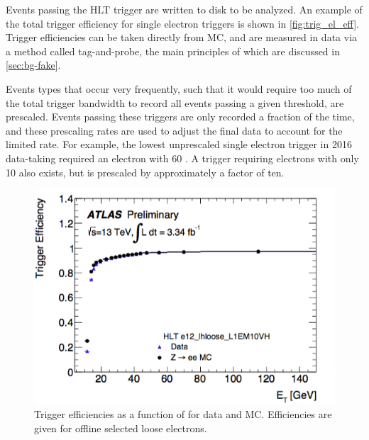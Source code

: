Events passing the \ac{HLT} trigger are written to disk to be analyzed. An example of the total trigger efficiency for single electron triggers is shown in \autoref{fig:trig_el_eff}. Trigger efficiencies can be taken directly from \ac{MC}, and are measured in data via a method called tag-and-probe, the main principles of which are discussed in \autoref{sec:bg-fake}.


Events types that occur very frequently, such that it would require too much of the total trigger bandwidth to record all events passing a given threshold, are prescaled. Events passing these triggers are only recorded a fraction of the time, and these prescaling rates are used to adjust the final data to account for the limited rate. For example, the lowest unprescaled single electron trigger in 2016 data-taking required an electron with 60 \gev \pt. A trigger requiring electrons with only 10 \gev \pt also exists, but is prescaled by approximately a factor of ten. 

\begin{centering}
\begin{figure}[!hbt]
\myfloatalign
\includegraphics[width=.90\linewidth]{figures/atlas/el_trig_eff.png}
\caption{Trigger efficiencies as a function of \et for data and \ac{MC}. Efficiencies are given for offline selected loose electrons.}
\label{fig:trig_el_eff}
\end{figure}
\end{centering}



